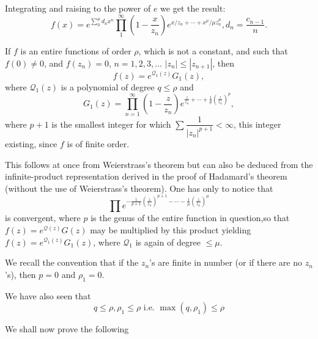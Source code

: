 Integrating and raising to the power of $e$ we get the result:
$$
f(x) = e^{\sum\limits^\mu_0 d_n x^n} \prod\limits^\infty_1
\left(1-\frac{x}{z_n} \right) e^{x/z_n + \cdots + x^{\mu}/\mu z^\mu_n},
d_n = \frac{c_{n-1}}{n}.
$$

If $f$ is an entire functions of order $\rho$, which is not a
constant, and such that $f(0) \neq 0$, and $f(z_n) =0$, $n = 1, 2, 3,
\ldots $ $|z_n| \leq |z_{n+1}|$, then
$$
f(z) = e^{\mathcal{Q}_1(z)} G_1 (z),
$$
where $\mathcal{Q}_1(z)$ is a polynomial of degree $q\leq \rho$ and 
$$
G_1 (z) = \prod\limits^\infty_{n=1} \left(1 -\frac{z}{z_n} \right)
e^{\frac{z}{z_n} + \cdots + \frac{1}{p} \left(\frac{z}{z_n} \right)^p}, 
$$
where $p+1$ is the smallest integer for which $\sum
\dfrac{1}{|z_n|^{p+1}} < \infty$,  this integer existing, since $f$ is
of finite order.

\begin{remark*}
This follows at once from Weierstrass's theorem but can also be
deduced from the infinite-product representation derived in the proof
of Hadamard's theorem (without the use of Weierstrass's theorem). One
has only to notice that
$$
\prod e^{-\frac{1}{p+1} \left(\frac{z}{z_n} \right)^{p+1} - \cdots -
  \frac{1}{\mu}  \left( \frac{z}{z_n}\right)^{\mu} }  
$$
is convergent, where $p$ is the genus of the entire function in
question,\pageoriginale so that $f(z) = e^{\mathcal{Q}(z)} G(z)$ may
be multiplied by this product yielding $f(z) =e^{\mathcal{Q}_1(z)}
G_1(z)$, where $\mathcal{Q}_1$ is again of degree $\leq \mu$.

We recall the convention that if the $z_n$'s  are finite in number
(or if there are no $z_n$'s), then $p=0$ and $\rho_1=0$.

We have also seen that
$$
q \leq \rho, \rho_1 \leq \rho \text{ i.e. } \max (q, \rho_1) \leq \rho
$$ 

We shall now prove the following 
\end{remark*}

